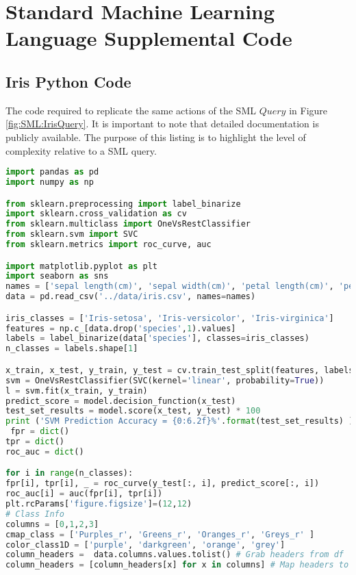\chapter{Standard Machine Learning Language Supplemental Code}
\section{Iris Python Code} \label{Appendix:Iris}

The code required to replicate the same actions of the SML \(Query\) in Figure \ref{fig:SML:IrisQuery}.  It is important to note that detailed documentation is publicly available. The purpose of this listing is to highlight the level of complexity relative to a SML query.

\begin{lstlisting}[language=python]
import pandas as pd
import numpy as np

from sklearn.preprocessing import label_binarize
import sklearn.cross_validation as cv
from sklearn.multiclass import OneVsRestClassifier
from sklearn.svm import SVC
from sklearn.metrics import roc_curve, auc

import matplotlib.pyplot as plt
import seaborn as sns
names = ['sepal length(cm)', 'sepal width(cm)', 'petal length(cm)', 'petal width(cm)', 'species']
data = pd.read_csv('../data/iris.csv', names=names)

iris_classes = ['Iris-setosa', 'Iris-versicolor', 'Iris-virginica']
features = np.c_[data.drop('species',1).values]
labels = label_binarize(data['species'], classes=iris_classes)
n_classes = labels.shape[1]

x_train, x_test, y_train, y_test = cv.train_test_split(features, labels, test_size=0.25)
svm = OneVsRestClassifier(SVC(kernel='linear', probability=True))
l = svm.fit(x_train, y_train)
predict_score = model.decision_function(x_test)
test_set_results = model.score(x_test, y_test) * 100
print ('SVM Prediction Accuracy = {0:6.2f}%'.format(test_set_results) )
 fpr = dict()
tpr = dict()
roc_auc = dict()

for i in range(n_classes):
fpr[i], tpr[i], _ = roc_curve(y_test[:, i], predict_score[:, i])
roc_auc[i] = auc(fpr[i], tpr[i])
plt.rcParams['figure.figsize']=(12,12)
# Class Info
columns = [0,1,2,3]
cmap_class = ['Purples_r', 'Greens_r', 'Oranges_r', 'Greys_r' ]
color_class1D = ['purple', 'darkgreen', 'orange', 'grey']
column_headers =  data.columns.values.tolist() # Grab headers from df
column_headers = [column_headers[x] for x in columns] # Map headers to indices selected


\end{lstlisting}
